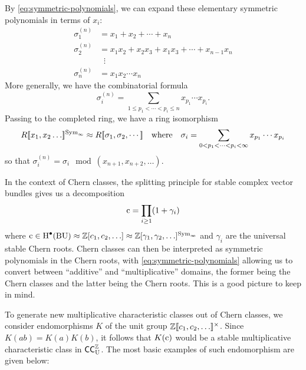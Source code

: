 By \cref{eq:symmetric-polynomials}, we can expand these elementary symmetric polynomials in terms of $x_i$:
\[
	\begin{aligned}
		\sigma_1^{(n)} & = x_1+x_2+\cdots + x_n                          \\
		\sigma_2^{(n)} & = x_1x_2 + x_2x_3 + x_1x_3 +\cdots + x_{n-1}x_n \\
		               & \;\;\vdots                                      \\
		\sigma_n^{(n)} & = x_1x_2\cdots x_n
	\end{aligned}
\]
More generally, we have the combinatorial formula
\[
	\sigma_i^{(n)} = \sum_{1\leq p_1<\cdots <p_i\leq n} x_{p_1}\cdots x_{p_i}.
\]
Passing to the completed ring, we have a ring isomorphism
\[
	R[\![x_1,x_2\ldots]\!]^{\mathrm{Sym}_\infty} \approx R[\![\sigma_1,\sigma_2,\cdots]\!]\quad\textrm{where}\quad \sigma_i = \sum_{0<p_1<\cdots < p_i<\infty}x_{p_1}\cdots x_{p_i}
\]
so that $\sigma_i^{(n)} = \sigma_i \mod (x_{n+1},x_{n+2},\ldots)$. 

\begin{remark*}
In the context of Chern classes, the splitting principle for stable complex vector bundles gives us a decomposition
\[
	\mathrm{c} = \prod_{i\geq 1}(1+\gamma_i)
\]
where $\mathrm{c}\in \operatorname{H}^\bullet(\mathrm{BU}) \approx \mathbb{Z}[c_1,c_2,\ldots]\approx \mathbb{Z}[\gamma_1,\gamma_2,\ldots]^{\mathrm{Sym}_\infty}$ and $\gamma_i$ are the universal stable Chern roots. Chern classes can then be interpreted as symmetric polynomials in the Chern roots, with \cref{eq:symmetric-polynomials} allowing us to convert between ``additive'' and ``multiplicative'' domains, the former being the Chern classes and the latter being the Chern roots. This is a good picture to keep in mind.
\end{remark*}

To generate new multiplicative characteristic classes out of Chern classes, we consider endomorphisms $K$ of the unit group $\mathbb{Z}[\![c_1,c_2,\ldots]\!]^\times$. Since $K(ab)=K(a)K(b)$, it follows that $K(\mathrm{c})$ would be a stable multiplicative characteristic class in $\mathsf{CC}^{\mathbb{Z}}_{\mathrm{U}}$. The most basic examples of such endomorphism are given below:


